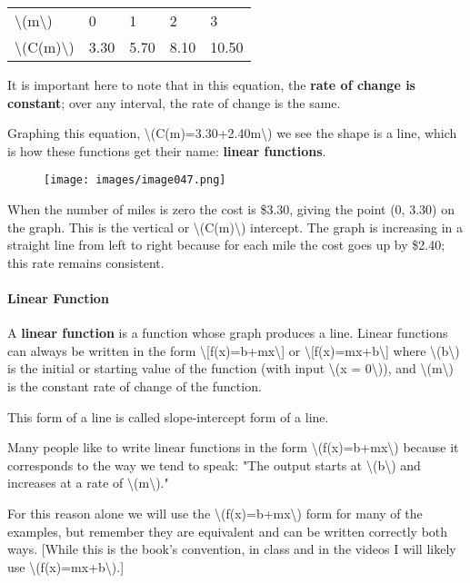 \begin{longtable}[]{@{}lllll@{}}
\toprule
\endhead
\textbackslash{}(m\textbackslash{}) & 0 & 1 & 2 & 3\tabularnewline
\textbackslash{}(C(m)\textbackslash{}) & 3.30 & 5.70 & 8.10 &
10.50\tabularnewline
\bottomrule
\end{longtable}

It is important here to note that in this equation, the \textbf{rate of
change is constant}; over any interval, the rate of change is the same.

Graphing this equation,
\textbackslash{}(C(m)=3.30+2.40m\textbackslash{}) we see the shape is a
line, which is how these functions get their name: \textbf{linear
functions}.

\begin{figure}
\centering
\texttt{[image: images/image047.png]}
\caption{}
\end{figure}

When the number of miles is zero the cost is \$3.30, giving the point
(0, 3.30) on the graph. This is the vertical or
\textbackslash{}(C(m)\textbackslash{}) intercept. The graph is
increasing in a straight line from left to right because for each mile
the cost goes up by \$2.40; this rate remains consistent.

\hypertarget{linear-function}{%
\paragraph{Linear Function}\label{linear-function}}

A \textbf{linear function} is a function whose graph produces a line.
Linear functions can always be written in the form
\textbackslash{}{[}f(x)=b+mx\textbackslash{}{]} or
\textbackslash{}{[}f(x)=mx+b\textbackslash{}{]} where
\textbackslash{}(b\textbackslash{}) is the initial or starting value of
the function (with input \textbackslash{}(x = 0\textbackslash{})), and
\textbackslash{}(m\textbackslash{}) is the constant rate of change of
the function.

This form of a line is called slope-intercept form of a line.

Many people like to write linear functions in the form
\textbackslash{}(f(x)=b+mx\textbackslash{}) because it corresponds to
the way we tend to speak: "The output starts at
\textbackslash{}(b\textbackslash{}) and increases at a rate of
\textbackslash{}(m\textbackslash{})."

For this reason alone we will use the
\textbackslash{}(f(x)=b+mx\textbackslash{}) form for many of the
examples, but remember they are equivalent and can be written correctly
both ways. {[}While this is the book's convention, in class and in the
videos I will likely use \textbackslash{}(f(x)=mx+b\textbackslash{}).{]}

